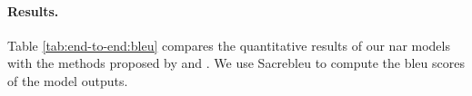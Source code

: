 



\paragraph{Results.} Table \ref{tab:end-to-end:bleu} compares the quantitative
results of our \ac{nar} models with the methods proposed by
\citet{gu2017nonautoregressive} and \citet{lee-etal-2018-deterministic}. We use
Sacrebleu \citep{post-2018-call} to compute the \acs{bleu} scores of the model
outputs.


